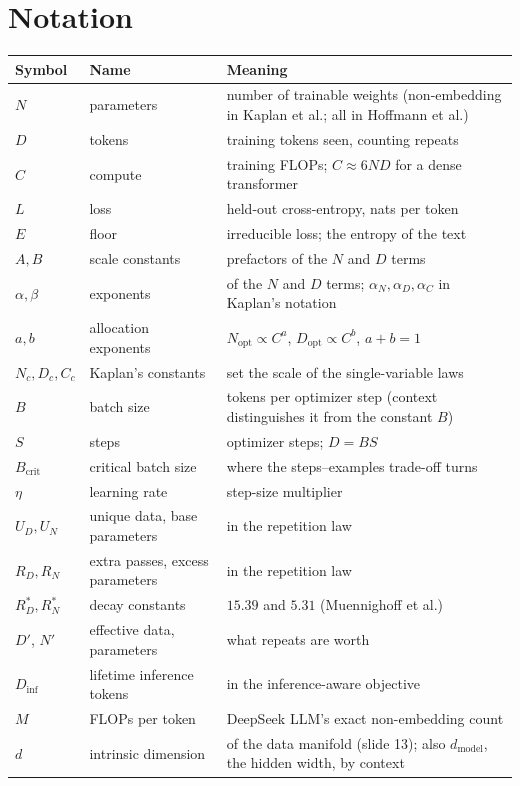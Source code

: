 \documentclass[11pt,letterpaper]{article}
\newcommand{\setstage}[1]{\colorlet{stagec}{#1}}
\newcommand{\Nopt}{N_{\mathrm{opt}}}
\newcommand{\Dopt}{D_{\mathrm{opt}}}
\begin{document}
\clearpage
\appendix
\setstage{ink}
\section{Notation}
\label{app:notation}

\begin{center}
\begin{tabular}{@{}llp{8.6cm}@{}}
\toprule
Symbol & Name & Meaning \\
\midrule
$N$ & parameters & number of trainable weights (non-embedding in Kaplan et al.; all in Hoffmann et al.) \\
$D$ & tokens & training tokens seen, counting repeats \\
$C$ & compute & training FLOPs; $C\approx6ND$ for a dense transformer \\
$L$ & loss & held-out cross-entropy, nats per token \\
$E$ & floor & irreducible loss; the entropy of the text \\
$A,B$ & scale constants & prefactors of the $N$ and $D$ terms \\
$\alpha,\beta$ & exponents & of the $N$ and $D$ terms; $\alpha_N,\alpha_D,\alpha_C$ in Kaplan's notation \\
$a,b$ & allocation exponents & $\Nopt\propto C^a$, $\Dopt\propto C^b$, $a+b=1$ \\
$N_c,D_c,C_c$ & Kaplan's constants & set the scale of the single-variable laws \\
$B$ & batch size & tokens per optimizer step (context distinguishes it from the constant $B$) \\
$S$ & steps & optimizer steps; $D=BS$ \\
$B_{\text{crit}}$ & critical batch size & where the steps--examples trade-off turns \\
$\eta$ & learning rate & step-size multiplier \\
$U_D,U_N$ & unique data, base parameters & in the repetition law \\
$R_D,R_N$ & extra passes, excess parameters & in the repetition law \\
$R_D^*,R_N^*$ & decay constants & $15.39$ and $5.31$ (Muennighoff et al.) \\
$D'$, $N'$ & effective data, parameters & what repeats are worth \\
$D_{\text{inf}}$ & lifetime inference tokens & in the inference-aware objective \\
$M$ & FLOPs per token & DeepSeek LLM's exact non-embedding count \\
$d$ & intrinsic dimension & of the data manifold (slide 13); also $d_{\text{model}}$, the hidden width, by context \\
\bottomrule
\end{tabular}
\end{center}
\end{document}

